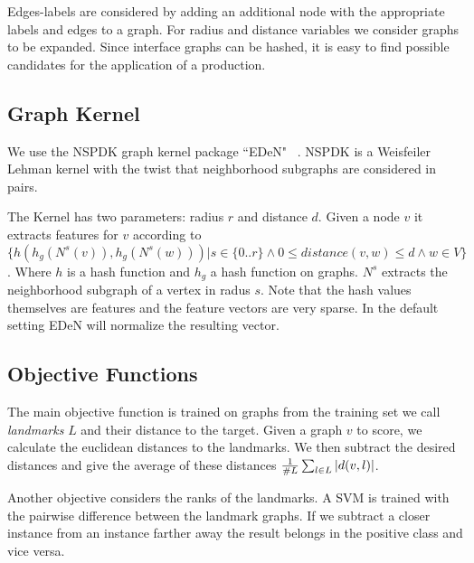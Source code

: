 \documentclass{esannV2}
\begin{document}
Edges-labels are considered by adding an additional node with the appropriate labels and edges to
a graph. For radius and distance variables we consider graphs to be expanded.
Since interface graphs can be hashed, it is easy to find possible
candidates for the application of a production. 


\subsection{Graph Kernel}
We use the NSPDK graph kernel package ``EDeN" ~\cite{costa2010fast}. NSPDK is a Weisfeiler Lehman \cite{weisfeiler}
kernel with the twist that neighborhood subgraphs are considered in pairs.

The Kernel has two parameters: radius $r$ and distance $d$. Given a node $v$ it extracts features for $v$ according to 
$\{ h(h_g(N^s(v)),h_g(N^s(w))) | s \in \{0..r\} \wedge 0 \leq
distance(v,w) \leq d  \wedge w\in V \}$.  Where $h$ is a hash function and 
$h_g$ a hash function on graphs. $N^s$ extracts the neighborhood subgraph of a
vertex in radus $s$. Note that the hash values themselves are features and the feature
vectors are very sparse. In the default setting EDeN will normalize the resulting vector.

\subsection{Objective Functions}

The main objective function is trained on graphs from the training set we call 
\emph{landmarks} $L$ and their distance to the target. 
Given a graph $v$ to score, we calculate the euclidean distances to the landmarks. We then subtract 
the desired distances and give the average of these distances 
$ {1 \over{\#L} }\sum_{l \in L} |d(v,l)|$.

Another objective considers the ranks of the landmarks. A SVM is trained 
with the pairwise difference between the landmark graphs. If we subtract a closer instance
from an instance farther away the result belongs in the positive class and vice versa.
\end{document}
